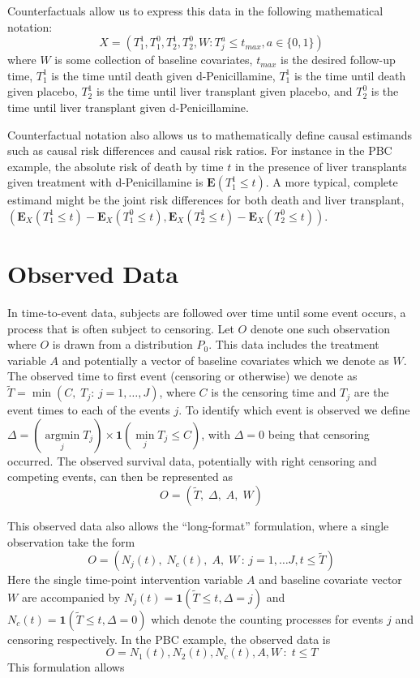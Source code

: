 \documentclass{report}
\newcommand{\1}{\ensuremath{\mathbf{1}}}
\DeclareMathOperator*{\argmin}{argmin}
\newcommand{\T}{\ensuremath{\widetilde{T}}}
\renewcommand{\L}{\ensuremath{W}}
\begin{document}
Counterfactuals allow us to express this data in the following mathematical notation:
\[ X = (T^1_1, T^0_1, T^1_2, T^0_2, \L : T^a_j \leq t_{max},  a \in \{0, 1\}) \]
where \(\L\) is some collection of baseline covariates, \(t_{max}\) is the desired follow-up time, \(T^1_1\) is the time until death given d-Penicillamine, \(T^1_1\) is the time until death given placebo, \(T^1_2\) is the time until liver transplant given placebo, and \(T^0_2\) is the time until liver transplant given d-Penicillamine.

Counterfactual notation also allows us to mathematically define causal estimands such as causal risk differences and causal risk ratios. For instance in the PBC example, the absolute risk of death by time \(t\) in the presence of liver transplants given treatment with d-Penicillamine is \(\mathbf{E}(T^1_1 \leq t)\). A more typical, complete estimand might be the joint risk differences for both death and liver transplant, \(\left(\mathbf{E}_X(T^1_1 \leq t) - \mathbf{E}_X(T^0_1 \leq t), \mathbf{E}_X(T^1_2 \leq t) - \mathbf{E}_X(T^0_2 \leq t)\right)\). 

\section{Observed Data}
In time-to-event data, subjects are followed over time until some event occurs, a process that is often subject to censoring. Let \(O\) denote one such observation where \(O\) is drawn from a distribution \(P_0\). This data includes the treatment variable \(A\) and potentially a vector of baseline covariates which we denote as \(\L\). The observed time to first event (censoring or otherwise) we denote as \(\T = \min(C,\; T_j :\, j = 1, \dots, J)\), where \(C\) is the censoring time and \(T_j\) are the event times to each of the events \(j\). To identify which event is observed we define \(\Delta = (\argmin\limits_j T_j) \times \1(\min\limits_j T_j \leq C)\), with \(\Delta = 0\) being that censoring occurred. The observed survival data, potentially with right censoring and competing events, can then be represented as 
\[O = (\T,\;\Delta,\;A,\;\L)\]

This observed data also allows the ``long-format'' formulation, where a single observation take the form
\[O = (N_j(t),\;N_c(t),\;A,\;\L\,:\, j = 1, \dots J, t \leq \T)\]
Here the single time-point intervention variable \(A\) and baseline covariate vector \(\L\) are accompanied by \(N_j(t) = \1(\T \leq t, \Delta = j)\) and \(N_c(t) = \1(\T \leq t, \Delta = 0)\) which denote the counting processes for events \(j\) and censoring respectively. In the PBC example, the observed data is
\[ O = N_1(t), N_2(t), N_c(t), A, \L \,:\; t \leq T \]
This formulation allows 
\end{document}
